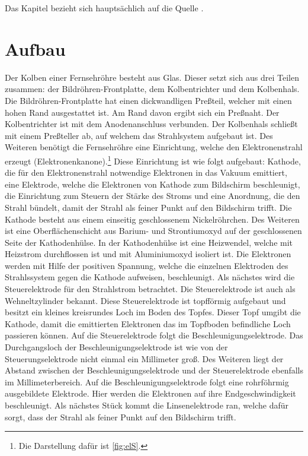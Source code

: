 Das Kapitel bezieht sich hauptsächlich auf die Quelle \cite{Fernsehroehre}.
\section{Aufbau}
\label{sec:aufbau}
Der Kolben einer Fernsehröhre besteht aus Glas.
Dieser setzt sich aus drei Teilen zusammen: der Bildröhren-Frontplatte, dem Kolbentrichter und dem Kolbenhals.
Die Bildröhren-Frontplatte hat einen dickwandligen Preßteil, welcher mit einen hohen Rand ausgestattet ist.
Am Rand davon ergibt sich ein Preßnaht.
Der Kolbentrichter ist mit dem Anodenanschluss verbunden.
Der Kolbenhals schließt mit einem Preßteller ab, auf welchem das Strahlsystem aufgebaut ist.
Des Weiteren benötigt die Fernsehröhre eine Einrichtung, welche den Elektronenstrahl erzeugt (Elektronenkanone).\footnote{Die Darstellung dafür ist \ref{fig:elS}.}
Diese Einrichtung ist wie folgt aufgebaut: Kathode, die für den Elektronenstrahl notwendige Elektronen in das Vakuum emittiert, eine Elektrode, welche die Elektronen von Kathode zum Bildschirm beschleunigt, die Einrichtung zum Steuern der Stärke des Stroms und eine Anordnung, die den Strahl bündelt, damit der Strahl als feiner Punkt auf den Bildschirm trifft. 
Die Kathode besteht aus einem einseitig geschlossenem Nickelröhrchen.
Des Weiteren ist eine Oberflächenschicht aus Barium- und Strontiumoxyd auf der geschlossenen Seite der Kathodenhülse.
In der Kathodenhülse ist eine Heizwendel, welche mit Heizstrom durchflossen ist und mit Aluminiumoxyd isoliert ist.
Die Elektronen werden mit Hilfe der positiven Spannung, welche die einzelnen Elektroden des Strahlssystem gegen die Kathode aufweisen, beschleunigt.
Als nächstes wird die Steuerelektrode für den Strahlstrom betrachtet.
Die Steuerelektrode ist auch als Wehneltzylinder bekannt.
Diese Steuerelektrode ist topfförmig aufgebaut und besitzt ein kleines kreisrundes Loch im Boden des Topfes.
Dieser Topf umgibt die Kathode, damit die emittierten Elektronen das im Topfboden befindliche Loch passieren können.
Auf die Steuerelektrode folgt die Beschleunigungselektrode.
Das Durchgangsloch der Beschleunigungselektrode ist wie von der Steuerungselektrode nicht einmal ein Millimeter groß.
Des Weiteren liegt der Abstand zwischen der Beschleunigungselektrode und der Steuerelektrode ebenfalls im Millimeterbereich.
Auf die Beschleunigungselektrode folgt eine rohrföhrmig ausgebildete Elektrode.
Hier werden die Elektronen auf ihre Endgeschwindigkeit beschleunigt.
Als nächstes Stück kommt die Linsenelektrode ran, welche dafür sorgt, dass der Strahl als feiner Punkt auf den Bildschirm trifft.
